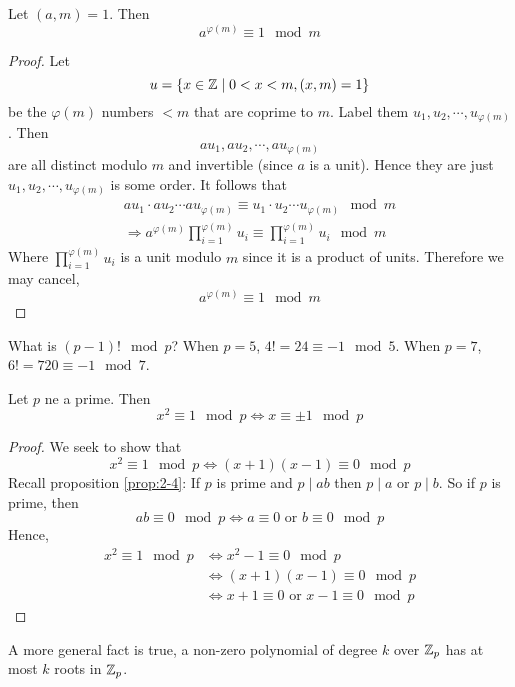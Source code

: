 \documentclass{article}
\begin{document}
\begin{thm}
    Let $(a,m) = 1$. Then
    \[
        a^{\varphi(m)} \equiv 1 \mod m  
    \]
\end{thm}
\begin{proof}
    Let 
    \[
        u = \left\{ x \in \mathbb{Z} \mid 0 < x < m, (x, m) = 1 \right\}  
    \]
    be the $\varphi(m)$ numbers $<m$ that are coprime to $m$. 
    Label them $u_1, u_2, \cdots, u_{\varphi(m)}$.
    Then
    \[
        au_1, au_2, \cdots, au_{\varphi(m)}
    \]
    are all distinct modulo $m$ and invertible (since $a$ is a unit).
    Hence they are just $u_1, u_2, \cdots, u_{\varphi(m)}$ is some order.
    It follows that
    \begin{align*}
        au_1 \cdot au_2 \cdots au_{\varphi(m)} \equiv u_1 \cdot u_2 \cdots u_{\varphi(m)} \mod m \\
        \Rightarrow a^{\varphi(m)} \prod_{i=1}^{\varphi(m)} u_i \equiv \prod_{i=1}^{\varphi(m)} u_i \mod m
    \end{align*}
    Where $\prod_{i=1}^{\varphi(m)} u_i$ is a unit modulo $m$ since it is a product of units.
    Therefore we may cancel,
    \[
        a^{\varphi(m)} \equiv 1 \mod m  
    \]
\end{proof}

\begin{question}
    What is $(p-1)! \mod p$?
    When $p = 5$, $4! = 24 \equiv -1 \mod 5$.
    When $p = 7$, $6! = 720 \equiv -1 \mod 7$.  
\end{question}


\begin{nlemma}\label{lem:2-14}
    Let $p$ ne a prime. Then
    \[
        x^2 \equiv 1 \mod p \Leftrightarrow x \equiv \pm 1 \mod p  
    \]
\end{nlemma}
\begin{proof}
    We seek to show that
    \[
        x^2 \equiv 1 \mod p \Leftrightarrow (x+1)(x-1) \equiv 0 \mod p
    \]
    Recall proposition \ref{prop:2-4}: If $p$ is prime and $p \mid ab$ then $p \mid a$ or $p \mid b$.
    So if $p$ is prime, then 
    \[
        ab \equiv 0 \mod p \Leftrightarrow a \equiv 0 \text{ or } b \equiv 0 \mod p
    \]
    Hence,
    \begin{align*}
        x^2 \equiv 1 \mod p &\Leftrightarrow x^2 - 1 \equiv 0 \mod p \\
        &\Leftrightarrow (x + 1)(x - 1) \equiv 0 \mod p \\
        &\Leftrightarrow x + 1 \equiv 0 \text{ or } x - 1 \equiv 0 \mod p
    \end{align*}
\end{proof}
\begin{remark}
    A more general fact is true, a non-zero polynomial of degree $k$ over $\mathbb{Z}_p$ has at most $k$ roots in $\mathbb{Z}_p$.
\end{remark}
\end{document}
